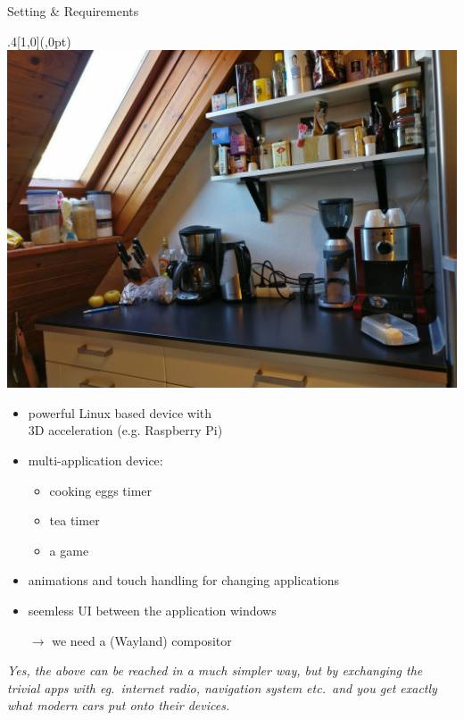 \documentclass[ucs,9pt]{beamer}
\begin{document}
\begin{frame}
    {Setting \& Requirements}

    \begin{textblock*}{.4\paperwidth}[1,0](\paperwidth,0pt)%
        \includegraphics[width=\linewidth]{kitchen-right.jpg}
    \end{textblock*}%

    \begin{itemize}
        \item powerful Linux based device with\\
            3D acceleration (e.g. Raspberry Pi)
        \item multi-application device:
            \begin{itemize}
                \item cooking eggs timer
                \item tea timer
                \item a game
            \end{itemize}
        \item animations and touch handling for changing applications
        \item seemless UI between the application windows
        \item [$\rightarrow$] we need a (Wayland) compositor
    \end{itemize}
    \bigskip

    \emph{Yes, the above can be reached in a much simpler way, but by exchanging the trivial apps with eg.\ internet radio, navigation system etc.\ and you get exactly what modern cars put onto their devices.}
\end{frame}
\end{document}
